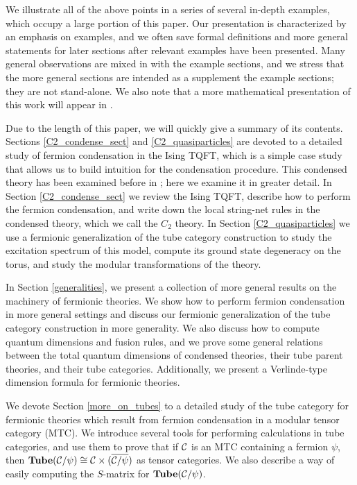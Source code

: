 We illustrate all  of the above points in a series of several in-depth examples, which occupy a large portion 
of this paper.
Our presentation is characterized by an emphasis on examples, 
and we often save formal definitions and more general statements 
for later sections after relevant examples have been presented.  
Many general observations are mixed in with the example sections,
and we stress that the more general sections are intended as a supplement
the example sections; they are not stand-alone.
We also note that a more mathematical presentation of this work will appear in \cite{Kevin and scott's paper?}. 


Due to the length of this paper, we will quickly give a summary of its contents.
Sections \ref{C2_condense_sect} and \ref{C2_quasiparticles} are devoted to a detailed study of 
fermion condensation in the Ising TQFT, which is a simple case study that allows us to build intuition for the condensation procedure.
This condensed theory has been examined before in \cite{bhardwaj2016, kapustin2017}; 
here we examine it in greater detail. 
In Section \ref{C2_condense_sect} we review the Ising TQFT, describe how to perform the 
fermion condensation, and write down the local string-net rules in the condensed theory, 
which we call the $C_2$ theory. 
In Section \ref{C2_quasiparticles} we use a fermionic generalization of the tube category 
construction to study the excitation spectrum of this model, compute its ground state 
degeneracy on the torus, and study the modular transformations %
of the theory. 

In Section \ref{generalities}, we present a collection of more general results
on the machinery of fermionic theories. 
We show how to perform fermion condensation in more general settings
and discuss our fermionic generalization 
of the tube category construction in more generality.
We also discuss how to compute quantum dimensions and fusion rules,
and we prove some general
relations between the total quantum dimensions of condensed theories, their 
tube parent theories, and their tube categories.
Additionally, we present a Verlinde-type
dimension formula for fermionic theories.

We devote Section \ref{more_on_tubes} to a detailed study of the tube category 
for fermionic theories which result from fermion condensation in a modular tensor category (MTC). 
We introduce several tools for performing calculations in tube categories, 
and use them to prove that if $\mathcal{C}$ is an MTC containing a fermion $\psi$, then
$\textbf{Tube}(\mathcal{C}/\psi)\cong \mathcal{C}\times (\overline{\mathcal{C}/\psi})$ as tensor 
categories. We also describe a way of easily computing the $S$-matrix for 
$\textbf{Tube}(\mathcal{C}/\psi)$. 

